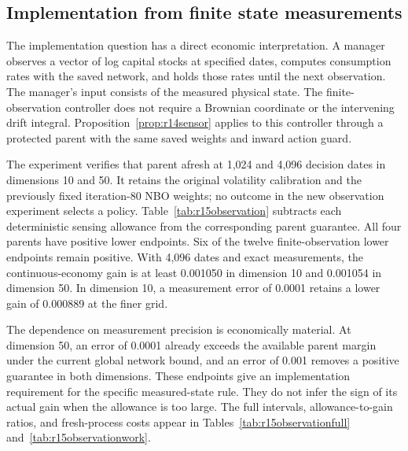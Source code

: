 \subsection{Implementation from finite state measurements}
\label{sec:r15observation}
The implementation question has a direct economic interpretation. A manager
observes a vector of log capital stocks at specified dates, computes consumption
rates with the saved network, and holds those rates until the next observation.
The manager's input consists of the measured physical state. The finite-observation
controller does not require a Brownian coordinate or the intervening drift integral.
Proposition~\ref{prop:r14sensor} applies to this controller through a protected
parent with the same saved weights and inward action guard.

The experiment verifies that parent afresh at 1,024 and 4,096 decision dates in
dimensions 10 and 50. It retains the original volatility calibration and the
previously fixed iteration-80 NBO weights; no outcome in the new observation
experiment selects a policy. Table~\ref{tab:r15observation} subtracts each
deterministic sensing allowance from the corresponding parent guarantee.
All four parents have positive lower endpoints. Six of the twelve
finite-observation lower endpoints remain positive. With 4,096 dates and exact
measurements, the continuous-economy gain is at least 0.001050 in dimension 10
and 0.001054 in dimension 50. In dimension 10, a measurement error of 0.0001
retains a lower gain of 0.000889 at the finer grid.

The dependence on measurement precision is economically material. At dimension
50, an error of 0.0001 already exceeds the available parent margin under the
current global network bound, and an error of 0.001 removes a positive guarantee
in both dimensions. These endpoints give an implementation requirement for the
specific measured-state rule. They do not infer the sign of its actual gain when
the allowance is too large. The full intervals, allowance-to-gain ratios, and
fresh-process costs appear in Tables~\ref{tab:r15observationfull}
and~\ref{tab:r15observationwork}.


